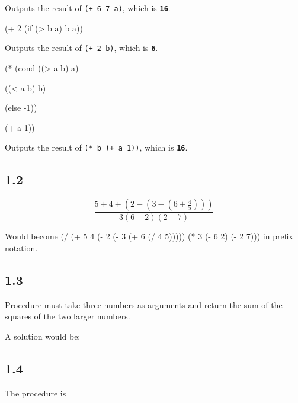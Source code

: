 \documentclass{article}
\begin{document}
Outputs the result of \texttt{(+ 6 7 a)}, which is \textbf{\texttt{16}}.

{\selectfont (+ 2 (if (> b a) b a))}

Outputs the result of \texttt{(+ 2 b)}, which is \textbf{\texttt{6}}.

{\selectfont (* (cond ((> a b) a)

        \hspace{8\fontdimen2\font} ((< a b) b)

        \hspace{8\fontdimen2\font} (else -1))

        \hspace{8\fontdimen2\font} (+ a 1))}

Outputs the result of \texttt{(* b (+ a 1))}, which is \textbf{\texttt{16}}.

\subsection*{1.2}

\[\frac{5 + 4 + (2 - (3 - (6 + \frac{4}{5})))}{3(6-2)(2-7)}\]

\noindent Would become (/ (+ 5 4 (- 2 (- 3 (+ 6 (/ 4 5))))) (* 3 (- 6 2) (- 2 7))) in prefix notation.

\subsection*{1.3}

\noindent Procedure must take three numbers as arguments and return the sum of the squares of the two larger numbers.

\noindent A solution would be:


\subsection*{1.4}
\noindent The procedure is 
\end{document}
